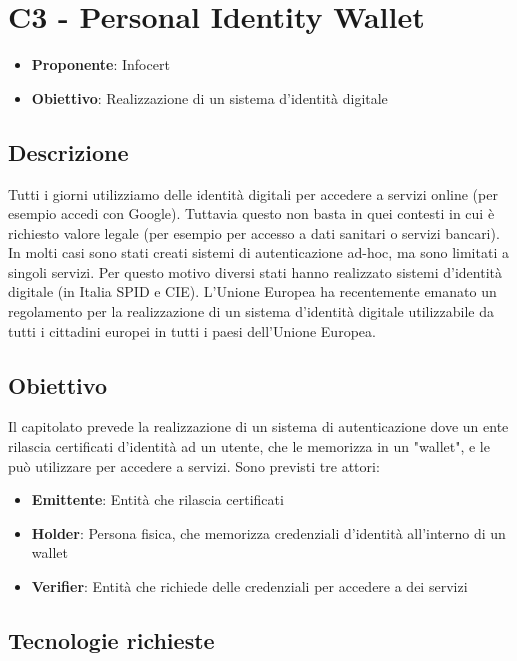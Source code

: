 \section*{C3 - Personal Identity Wallet}
\begin{itemize}
    \item \textbf{Proponente}: Infocert
    \item \textbf{Obiettivo}: Realizzazione di un sistema d'identità digitale
\end{itemize}

 \subsection*{Descrizione}
 Tutti i giorni utilizziamo delle identità digitali per accedere a servizi online (per esempio
 accedi con Google). Tuttavia questo non basta in quei contesti in cui è richiesto valore
 legale (per esempio per accesso a dati sanitari o servizi bancari). In molti casi sono stati
 creati sistemi di autenticazione ad-hoc, ma sono limitati a singoli servizi.
 Per questo motivo diversi stati hanno realizzato sistemi d'identità digitale (in Italia SPID
 e CIE). L’Unione Europea ha recentemente emanato un regolamento per la realizzazione
 di un sistema d'identità digitale utilizzabile da tutti i cittadini europei in tutti i paesi
 dell’Unione Europea.
 
 \subsection*{Obiettivo}
 Il capitolato prevede la realizzazione di un sistema di autenticazione dove un ente rilascia
certificati d'identità ad un utente, che le memorizza in un "wallet", e le può utilizzare
per accedere a servizi. Sono previsti tre attori:
\begin{itemize}
    \item \textbf{Emittente}: Entità che rilascia certificati
    \item \textbf{Holder}: Persona fisica, che memorizza credenziali d'identità all’interno di un wallet
    \item \textbf{Verifier}: Entità che richiede delle credenziali per accedere a dei servizi
\end{itemize}

\subsection*{Tecnologie richieste}

